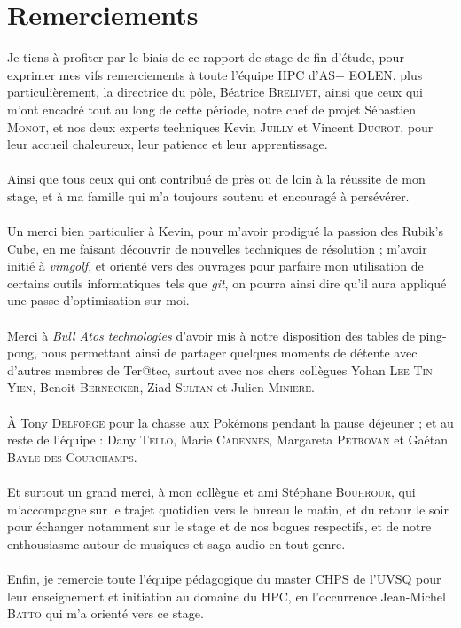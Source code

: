 \part*{Remerciements}
\sloppy
Je tiens à profiter par le biais de ce rapport de stage de fin d'étude, pour
exprimer mes vifs remerciements à toute l'équipe HPC d'AS+ EOLEN, plus
particulièrement, la directrice du pôle, Béatrice \textsc{Brelivet}, ainsi
que ceux qui m'ont encadré tout au long de cette période, notre chef de projet
Sébastien \textsc{Monot}, et nos deux experts techniques Kevin \textsc{Juilly}
et Vincent \textsc{Ducrot}, pour leur accueil chaleureux, leur patience et leur
apprentissage.
\\
\\
Ainsi que tous ceux qui ont contribué de près ou de loin à la réussite de mon
stage, et à ma famille qui m'a toujours soutenu et encouragé à persévérer.
\\
\\
Un merci bien particulier à Kevin, pour m'avoir prodigué la passion des Rubik's
Cube, en me faisant découvrir de nouvelles techniques de résolution ; m'avoir
initié à \emph{vimgolf}, et orienté vers des ouvrages pour parfaire mon
utilisation de certains outils informatiques tels que \emph{git}, on pourra
ainsi dire qu'il aura appliqué une passe d'optimisation sur moi.
\\
\\
Merci à \emph{Bull Atos technologies} d'avoir mis à notre disposition des tables
de ping-pong, nous permettant ainsi de partager quelques moments de détente avec
d'autres membres de Ter@tec, surtout avec nos chers collègues Yohan \textsc{Lee
Tin Yien}, Benoit \textsc{Bernecker}, Ziad \textsc{Sultan} et Julien
\textsc{Miniere}.
\\
\\
À Tony \textsc{Delforge} pour la chasse aux Pokémons pendant la pause déjeuner ;
et au reste de l'équipe : Dany \textsc{Tello}, Marie \textsc{Cadennes},
Margareta \textsc{Petrovan} et Gaétan \textsc{Bayle des Courchamps}.
\\
\\
Et surtout un grand merci, à mon collègue et ami Stéphane \textsc{Bouhrour}, qui
m'accompagne sur le trajet quotidien vers le bureau le matin, et du retour le
soir pour échanger notamment sur le stage et de nos bogues respectifs, et de
notre enthousiasme autour de musiques et saga audio en tout genre.
\\
\\
Enfin, je remercie toute l'équipe pédagogique du master CHPS de l'UVSQ pour leur
enseignement et initiation au domaine du HPC, en l'occurrence Jean-Michel
\textsc{Batto} qui m'a orienté vers ce stage.
